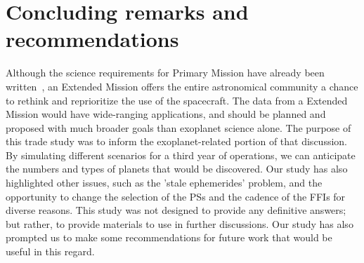 \section{Concluding remarks and recommendations}
\label{sec:conclusions}

Although the science requirements for \tesss Primary Mission have already been
written~\citep{ricker_transiting_2014}, an Extended Mission offers the
entire astronomical community a chance to rethink and reprioritize the use of the spacecraft.
The data from a \tess Extended Mission would have wide-ranging applications, and should be planned and proposed with much broader goals than exoplanet science alone. 
The purpose of this trade study was to inform the exoplanet-related portion of that
discussion. By simulating different scenarios for a third year of operations, we can anticipate
the numbers and types of planets that would be discovered. Our study has also highlighted other issues,
such as the 'stale ephemerides' problem, and the opportunity to change the
selection of the PSs and the cadence of the FFIs for diverse reasons.
This study was not designed to provide any definitive answers; but rather,
to provide materials to use in further discussions.  Our study has also
prompted us to make
some recommendations for future work that would be useful in this regard.

